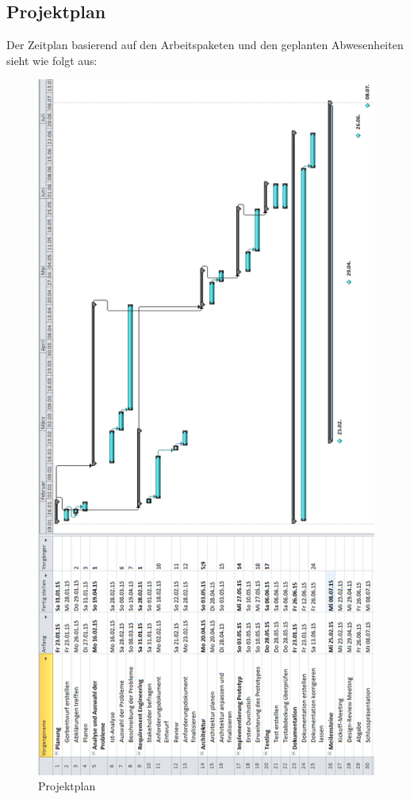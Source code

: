 \subsection{Projektplan}\label{projektplan}
Der Zeitplan basierend auf den Arbeitspaketen und den geplanten Abwesenheiten sieht wie folgt aus:
\begin{figure}[h]
\centering
\includegraphics[scale=0.422]{images/project/projectplan.png}
\caption[Projektplan]{Projektplan \selfmade{}}
\label{fig:psp}
\end{figure}

